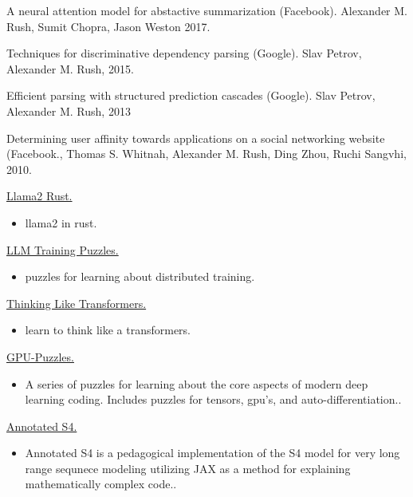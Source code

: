 \documentclass[10pt]{article}
\begin{document}
\bigskip
{}

\ind A neural attention model for abstactive summarization (Facebook). Alexander M. Rush, Sumit Chopra, Jason Weston 2017.
\medskip

\ind Techniques for discriminative dependency parsing (Google). Slav Petrov, Alexander M. Rush, 2015.
\medskip

\ind Efficient parsing with structured prediction cascades (Google). Slav Petrov, Alexander M. Rush, 2013
\medskip

\ind  Determining user affinity towards applications on a social networking website (Facebook., Thomas S. Whitnah, Alexander M. Rush, Ding Zhou, Ruchi Sangvhi, 2010.



\bigskip


\bigskip

\ind \href{ paper.link } { Llama2 Rust. }
\begin{itemize}
	\item llama2 in rust.
\end{itemize}
\medskip


\ind \href{ paper.link } { LLM Training Puzzles. }
\begin{itemize}
	\item puzzles for learning about distributed training.
\end{itemize}
\medskip


\ind \href{ paper.link } { Thinking Like Transformers. }
\begin{itemize}
	\item learn to think like a transformers.
\end{itemize}
\medskip


\ind \href{ paper.link } { GPU-Puzzles. }
\begin{itemize}
	\item A series of puzzles for learning about the core aspects of modern deep learning coding. Includes puzzles for tensors, gpu's, and auto-differentiation..
\end{itemize}
\medskip


\ind \href{ paper.link } { Annotated S4. }
\begin{itemize}
	\item Annotated S4 is a pedagogical implementation of the S4 model for very long range sequnece modeling utilizing JAX as a method for explaining mathematically complex code..
\end{itemize}
\medskip
\end{document}
